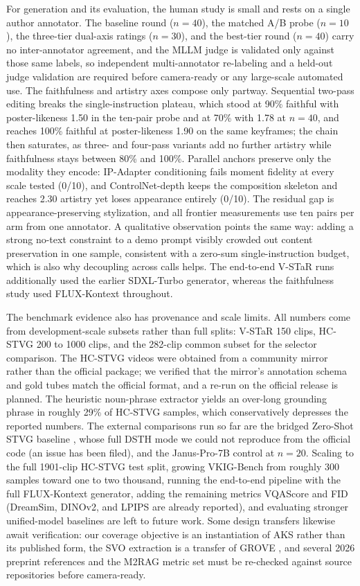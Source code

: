 For generation and its evaluation, the human study is small and rests on a single author annotator. The baseline round ($n=40$), the matched A/B probe ($n=10$), the three-tier dual-axis ratings ($n=30$), and the best-tier round ($n=40$) carry no inter-annotator agreement, and the MLLM judge is validated only against those same labels, so independent multi-annotator re-labeling and a held-out judge validation are required before camera-ready or any large-scale automated use. The faithfulness and artistry axes compose only partway. Sequential two-pass editing breaks the single-instruction plateau, which stood at 90\% faithful with poster-likeness 1.50 in the ten-pair probe and at 70\% with 1.78 at $n=40$, and reaches 100\% faithful at poster-likeness 1.90 on the same keyframes; the chain then saturates, as three- and four-pass variants add no further artistry while faithfulness stays between 80\% and 100\%. Parallel anchors preserve only the modality they encode: IP-Adapter conditioning fails moment fidelity at every scale tested (0/10), and ControlNet-depth keeps the composition skeleton and reaches 2.30 artistry yet loses appearance entirely (0/10). The residual gap is appearance-preserving stylization, and all frontier measurements use ten pairs per arm from one annotator. A qualitative observation points the same way: adding a strong no-text constraint to a demo prompt visibly crowded out content preservation in one sample, consistent with a zero-sum single-instruction budget, which is also why decoupling across calls helps. The end-to-end V-STaR runs additionally used the earlier SDXL-Turbo generator, whereas the faithfulness study used FLUX-Kontext throughout.

The benchmark evidence also has provenance and scale limits. All numbers come from development-scale subsets rather than full splits: V-STaR 150 clips, HC-STVG 200 to 1000 clips, and the 282-clip common subset for the selector comparison. The HC-STVG videos were obtained from a community mirror rather than the official package; we verified that the mirror's annotation schema and gold tubes match the official format, and a re-run on the official release is planned. The heuristic noun-phrase extractor yields an over-long grounding phrase in roughly 29\% of HC-STVG samples, which conservatively depresses the reported numbers. The external comparisons run so far are the bridged Zero-Shot STVG baseline \citep{zeroshotstvg2509}, whose full DSTH mode we could not reproduce from the official code (an issue has been filed), and the Janus-Pro-7B control \citep{januspro2501} at $n=20$. Scaling to the full 1901-clip HC-STVG test split, growing VKIG-Bench from roughly 300 samples toward one to two thousand, running the end-to-end pipeline with the full FLUX-Kontext generator, adding the remaining metrics VQAScore and FID (DreamSim, DINOv2, and LPIPS are already reported), and evaluating stronger unified-model baselines are left to future work. Some design transfers likewise await verification: our coverage objective is an instantiation of AKS \citep{aks2502} rather than its published form, the SVO extraction is a transfer of GROVE \citep{grove2503}, and several 2026 preprint references and the M2RAG \citep{m2rag2411} metric set must be re-checked against source repositories before camera-ready.

